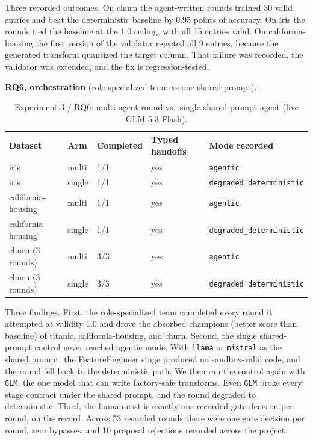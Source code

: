 Three recorded outcomes. On churn the agent-written rounds trained 30 valid entries and beat the deterministic baseline by 0.95 points of accuracy. On iris the rounds tied the baseline at the 1.0 ceiling, with all 15 entries valid. On california-housing the first version of the validator rejected all 9 entries, because the generated transform quantized the target column. That failure was recorded, the validator was extended, and the fix is regression-tested.

\textbf{RQ6, orchestration} (role-specialized team vs one shared prompt).

\begin{table}[H]
\centering
\caption{Experiment 3 / RQ6: multi-agent round vs.\ single shared-prompt agent (live GLM 5.3 Flash).}
\label{tab:rq6}
\small
\begin{tabular}{p{3.2cm}p{3.0cm}p{2.8cm}p{2.6cm}p{2.2cm}}
\toprule
\textbf{Dataset} & \textbf{Arm} & \textbf{Completed} & \textbf{Typed handoffs} & \textbf{Mode recorded} \\
\midrule
iris & multi & 1/1 & yes & \texttt{agentic} \\
iris & single & 1/1 & yes & \texttt{degraded\_deterministic} \\
california-housing & multi & 1/1 & yes & \texttt{agentic} \\
california-housing & single & 1/1 & yes & \texttt{degraded\_deterministic} \\
churn (3 rounds) & multi & 3/3 & yes & \texttt{agentic} \\
churn (3 rounds) & single & 3/3 & yes & \texttt{degraded\_deterministic} \\
\bottomrule
\end{tabular}
\end{table}

Three findings. First, the role-specialized team completed every round it attempted at validity 1.0 and drove the absorbed champions (better score than baseline) of titanic, california-housing, and churn. Second, the single shared-prompt control never reached agentic mode. With \texttt{llama} or \texttt{mistral} as the shared prompt, the FeatureEngineer stage produced no sandbox-valid code, and the round fell back to the deterministic path. We then ran the control again with \texttt{GLM}, the one model that can write factory-safe transforms. Even \texttt{GLM} broke every stage contract under the shared prompt, and the round degraded to deterministic. Third, the human cost is exactly one recorded gate decision per round, on the record. Across 53 recorded rounds there were one gate decision per round, zero bypasses, and 10 proposal rejections recorded across the project.

